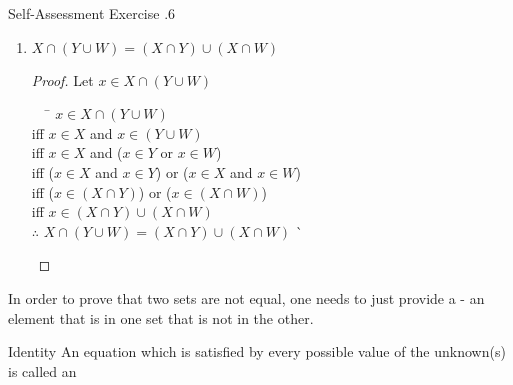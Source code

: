 \documentclass[../notes.tex]{subfiles}
\begin{document}
\begin{exercise}{Self-Assessment Exercise \thechapter.6}
\begin{enumerate}[label=(\alph*), itemsep=0.5em]
\begin{proof}
\begin{tabbing}
								$\therefore$ \> $X \cap (Y \cap W) = (X \cap Y) \cap W$ \` \qedhere
							\end{tabbing}
						\end{proof}
					\item $X \cap (Y \cup W) = (X \cap Y) \cup (X \cap W)$
						\begin{proof}
							Let $x \in X \cap (Y \cup W)$
							\begin{tabbing}
								$\quad$ \= $x \in X \cap (Y \cup W)$\\
								iff \> $x \in X$ and $x \in (Y \cup W)$\\
								iff \> $x \in X$ and ($x \in Y$ or $x \in W$)\\
								iff \> ($x \in X$ and $x \in Y$) or ($x \in X$ and $x \in W$)\\
								iff \> ($x \in (X \cap Y)$) or ($x \in (X \cap W)$)\\
								iff \> $x \in (X \cap Y) \cup (X \cap W)$\\
								$\therefore$ \> $X \cap (Y \cup W) = (X \cap Y) \cup (X \cap W)$ \` \qedhere
							\end{tabbing}
						\end{proof}
				\end{enumerate}
			\end{exercise}
			In order to prove that two sets are not equal, one needs to just provide a  - an element that is in one set that is not in the other.
			\begin{definition}{Identity}
				An equation which is satisfied by every possible value of the unknown(s) is called an 
			\end{definition}
		\pagebreak
\end{document}

